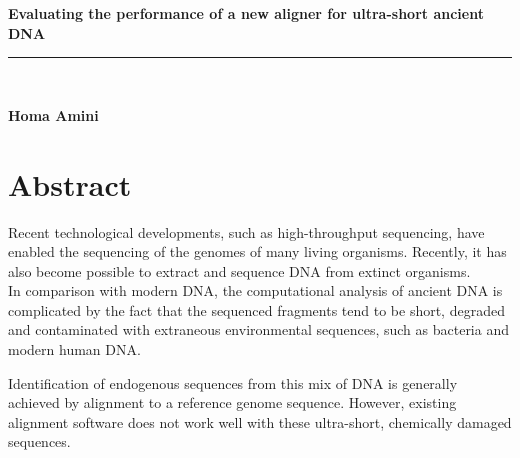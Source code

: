 \documentclass[11pt,a4paper]{report}
\makeatletter
\newcommand{\at}{\makeatletter @\makeatother}
\newcommand{\HRule}{\rule{\linewidth}{0.5mm}}
\makeatother
\begin{document}

\begin{titlepage}
\begin{center}
{ \huge \bfseries \textbf{ Evaluating the performance of a new aligner for ultra-short ancient DNA }}\\[0.4cm]
\HRule \\[0.5cm]
\begin{minipage}{0.9\textwidth}
\begin{flushleft} \large
{\textbf{Homa Amini}}\\
\end{flushleft}
\end{minipage}
\vfill
\end{center}
\end{titlepage}

\newpage\null\thispagestyle{empty}\newpage
\newpage
\newpage

\section*{Abstract}

Recent technological developments, such as high-throughput sequencing,
have enabled the sequencing of the genomes of many living organisms.  
Recently, it has also become possible to extract and sequence DNA from 
extinct organisms.\\ 
In comparison with modern DNA, the computational analysis of ancient DNA
is complicated by the fact that the sequenced fragments tend to be short,
degraded and contaminated with extraneous environmental sequences, such 
as bacteria and modern human DNA.

Identification of endogenous sequences from this mix of DNA is generally
achieved by alignment to a reference genome sequence. However, existing 
alignment software does not work well with these ultra-short, chemically
damaged sequences.
\end{document}
